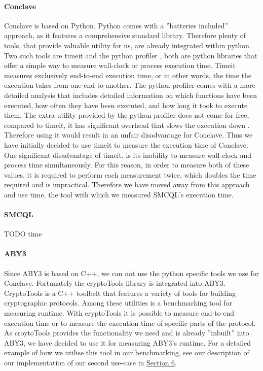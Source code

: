 \paragraph{Conclave}
Conclave is based on Python. Python comes with a ''batteries included'' approach, as it features a comprehensive standard library. Therefore plenty of tools, that provide valuable utility for us, are already integrated within python. Two such tools are timeit \cite{time} and the python profiler \cite{cProfile}, both are python libraries that offer a simple way to measure wall-clock or process execution time. Timeit measures exclusively end-to-end execution time, or in other words, the time the execution takes from one end to another. The python profiler comes with a more detailed analysis that includes detailed information on which functions have been executed, how often they have been executed, and how long it took to execute them. The extra utility provided by the python profiler does not come for free, compared to timeit, it has significant overhead that slows the execution down \cite{cProfile}. Therefore using it would result in an unfair disadvantage for Conclave. Thus we have initially decided to use timeit to measure the execution time of Conclave. One significant disadvantage of timeit, is its inability to measure wall-clock and process time simultaneously. For this reason, in order to measure both of these values, it is required to perform each measurement twice, which doubles the time required and is impractical. Therefore we have moved away from this approach and use time, the tool with which we measured SMCQL's execution time.  
\paragraph{SMCQL}

TODO time \cite{time_sh}
\paragraph{ABY3}
Since ABY3 is based on C++, we can not use the python specific tools we use for Conclave. Fortunately the cryptoTools library \cite{cryotoTools} is integrated into ABY3. CryptoTools is a C++ toolbelt that features a variety of tools for building cryptographic protocols. Among these utilities is a benchmarking tool for measuring runtime. With cryptoTools it is possible to measure end-to-end execution time or to measure the execution time of specific parts of the protocol. As croytoTools provides the functionality we need and is already ''inbuilt'' into ABY3, we have decided to use it for measuring ABY3's runtime. For a detailed example of how we utilise this tool in our benchmarking, see our description of our implementation of our second use-case in \hyperref[Implemetation]{Section 6}.




